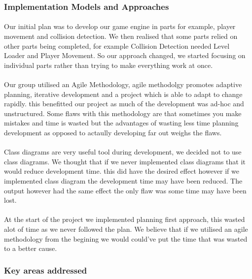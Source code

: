 \documentclass{article}
\begin{document}
\subsubsection{Implementation Models and Approaches}
\paragraph{}
Our initial plan was to develop our game engine in parts for example, player movement and collision detection. We then realised that some parts relied on other parts being completed, for example Collision Detection needed Level Loader and Player Movement. So our approach changed, we started focusing on individual parts rather than trying to make everything work at once. 
\paragraph{}
Our group utilised an Agile Methodology, agile methodolgy promotes adaptive planning, iterative development and a project which is able to adapt to change rapidly. this benefitted our project as much of the development was ad-hoc and unstructured. Some flaws with this methodology are that sometimes you make mistakes and time is wasted but the advantages of wasting less time planning development as opposed to actaully developing far out weighs the flaws. 
\paragraph{}
Class diagrams are very useful tool during development, we decided not to use class diagrams. We thought that if we never implemented class diagrams that it would reduce development time. this did have the desired effect however if we implemented class diagram the development time may have been reduced. The  output however had the same effect the only flaw was some time may have been lost. 
\paragraph{}
At the start of the project we implemented planning first approach, this wasted alot of time as we never followed the plan. We believe that if we utilised an agile methodology from the begining we would could've put the time that was wasted to a better cause.
\subsubsection{Key areas addressed}
\end{document}
